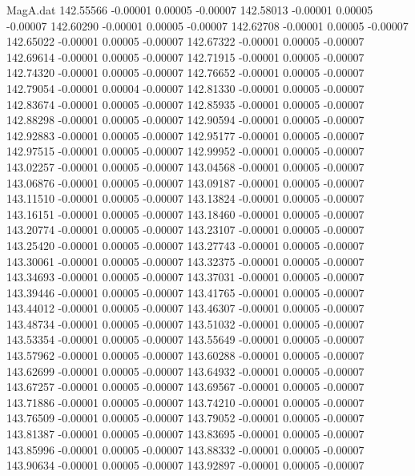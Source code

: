 \begin{filecontents}{MagA.dat}
 142.55566   -0.00001    0.00005   -0.00007
 142.58013   -0.00001    0.00005   -0.00007
 142.60290   -0.00001    0.00005   -0.00007
 142.62708   -0.00001    0.00005   -0.00007
 142.65022   -0.00001    0.00005   -0.00007
 142.67322   -0.00001    0.00005   -0.00007
 142.69614   -0.00001    0.00005   -0.00007
 142.71915   -0.00001    0.00005   -0.00007
 142.74320   -0.00001    0.00005   -0.00007
 142.76652   -0.00001    0.00005   -0.00007
 142.79054   -0.00001    0.00004   -0.00007
 142.81330   -0.00001    0.00005   -0.00007
 142.83674   -0.00001    0.00005   -0.00007
 142.85935   -0.00001    0.00005   -0.00007
 142.88298   -0.00001    0.00005   -0.00007
 142.90594   -0.00001    0.00005   -0.00007
 142.92883   -0.00001    0.00005   -0.00007
 142.95177   -0.00001    0.00005   -0.00007
 142.97515   -0.00001    0.00005   -0.00007
 142.99952   -0.00001    0.00005   -0.00007
 143.02257   -0.00001    0.00005   -0.00007
 143.04568   -0.00001    0.00005   -0.00007
 143.06876   -0.00001    0.00005   -0.00007
 143.09187   -0.00001    0.00005   -0.00007
 143.11510   -0.00001    0.00005   -0.00007
 143.13824   -0.00001    0.00005   -0.00007
 143.16151   -0.00001    0.00005   -0.00007
 143.18460   -0.00001    0.00005   -0.00007
 143.20774   -0.00001    0.00005   -0.00007
 143.23107   -0.00001    0.00005   -0.00007
 143.25420   -0.00001    0.00005   -0.00007
 143.27743   -0.00001    0.00005   -0.00007
 143.30061   -0.00001    0.00005   -0.00007
 143.32375   -0.00001    0.00005   -0.00007
 143.34693   -0.00001    0.00005   -0.00007
 143.37031   -0.00001    0.00005   -0.00007
 143.39446   -0.00001    0.00005   -0.00007
 143.41765   -0.00001    0.00005   -0.00007
 143.44012   -0.00001    0.00005   -0.00007
 143.46307   -0.00001    0.00005   -0.00007
 143.48734   -0.00001    0.00005   -0.00007
 143.51032   -0.00001    0.00005   -0.00007
 143.53354   -0.00001    0.00005   -0.00007
 143.55649   -0.00001    0.00005   -0.00007
 143.57962   -0.00001    0.00005   -0.00007
 143.60288   -0.00001    0.00005   -0.00007
 143.62699   -0.00001    0.00005   -0.00007
 143.64932   -0.00001    0.00005   -0.00007
 143.67257   -0.00001    0.00005   -0.00007
 143.69567   -0.00001    0.00005   -0.00007
 143.71886   -0.00001    0.00005   -0.00007
 143.74210   -0.00001    0.00005   -0.00007
 143.76509   -0.00001    0.00005   -0.00007
 143.79052   -0.00001    0.00005   -0.00007
 143.81387   -0.00001    0.00005   -0.00007
 143.83695   -0.00001    0.00005   -0.00007
 143.85996   -0.00001    0.00005   -0.00007
 143.88332   -0.00001    0.00005   -0.00007
 143.90634   -0.00001    0.00005   -0.00007
 143.92897   -0.00001    0.00005   -0.00007

\end{filecontents}

